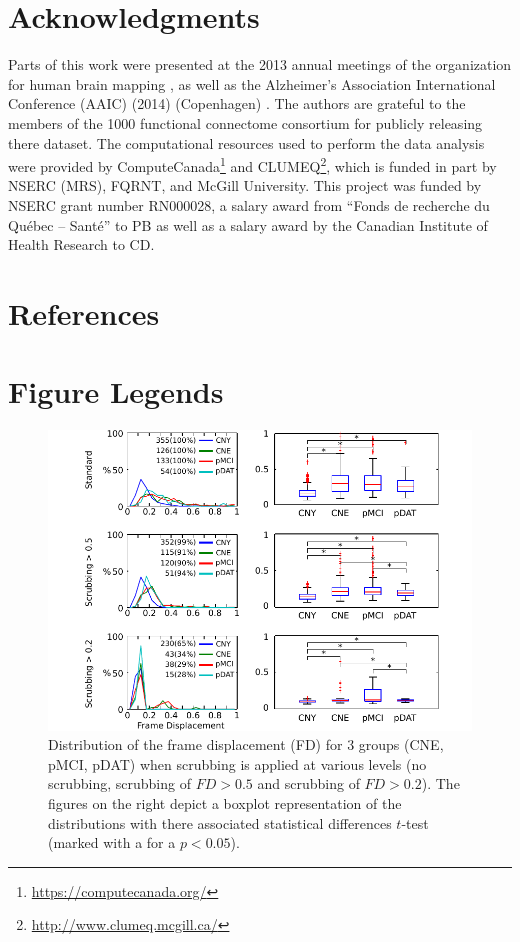 \documentclass[authoryear]{elsarticle}
\begin{document}
\section{Acknowledgments}
Parts of this work were presented at the 2013 annual meetings of the organization for human brain mapping \citep{Dansereau2013}, as well as the  Alzheimer's Association International Conference (AAIC) (2014) (Copenhagen) \citep{Dansereau2014}. The authors are grateful to the members of the 1000 functional connectome consortium for publicly releasing there dataset. The computational resources used to perform the data analysis were provided by ComputeCanada\footnote{\url{https://computecanada.org/}} and CLUMEQ\footnote{\url{http://www.clumeq.mcgill.ca/}}, which is funded in part by NSERC (MRS), FQRNT, and McGill University. This project was funded by NSERC grant number RN000028, a salary award from ``Fonds de recherche du Qu\'ebec -- Sant\'e'' to PB as well as a salary award by the Canadian Institute of Health Research to CD.

\section*{References}





\pagebreak

\section{Figure Legends}
\begin{figure}[!ht]
\begin{center}
\includegraphics[width=\linewidth]{../figures/figure_fd_distrib.pdf}
\end{center}
\caption{
Distribution of the frame displacement (FD) for 3 groups (CNE, pMCI, pDAT) when scrubbing is applied at various levels (no scrubbing, scrubbing of $FD>0.5$ and scrubbing of $FD>0.2$). The figures on the right depict a boxplot representation of the distributions with there associated statistical differences $t$-test (marked with a {\bf *} for a $p<0.05$).
}
\label{fig_dist}
\end{figure}
\end{document}
